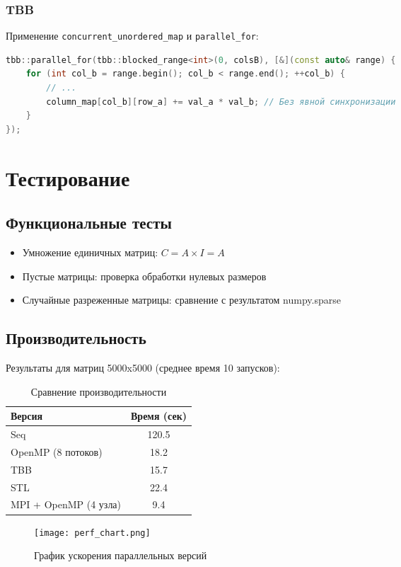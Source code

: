 \documentclass[12pt]{article}
\begin{document}
\subsubsection{TBB}
Применение \texttt{concurrent\_unordered\_map} и \texttt{parallel\_for}:
\begin{lstlisting}[language=C++, caption=Фрагмент кода TBB]
tbb::parallel_for(tbb::blocked_range<int>(0, colsB), [&](const auto& range) {
    for (int col_b = range.begin(); col_b < range.end(); ++col_b) {
        // ...
        column_map[col_b][row_a] += val_a * val_b; // Без явной синхронизации
    }
});
\end{lstlisting}

\section{Тестирование}
\subsection{Функциональные тесты}
\begin{itemize}
    \item Умножение единичных матриц: \( C = A \times I = A \)
    \item Пустые матрицы: проверка обработки нулевых размеров
    \item Случайные разреженные матрицы: сравнение с результатом numpy.sparse
\end{itemize}

\subsection{Производительность}
Результаты для матриц 5000x5000 (среднее время 10 запусков):
\begin{table}[h]
\centering
\begin{tabular}{|l|c|}
\hline
Версия & Время (сек) \\ \hline
Seq & 120.5 \\ \hline
OpenMP (8 потоков) & 18.2 \\ \hline
TBB & 15.7 \\ \hline
STL & 22.4 \\ \hline
MPI + OpenMP (4 узла) & 9.4 \\ \hline
\end{tabular}
\caption{Сравнение производительности}
\end{table}

\begin{figure}[h]
\centering
\texttt{[image: perf\_chart.png]}
\caption{График ускорения параллельных версий}
\end{figure}
\end{document}
